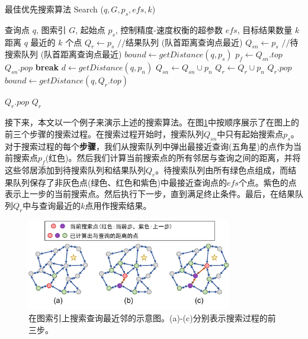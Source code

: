 \begin{algorithm}[t]
  \caption{最佳优先搜索算法 Search ($q, G, p_s, efs, k$)}
  \begin{algorithmic}[1]
    \REQUIRE 
    查询点 $q$, 图索引 $G$, 起始点 $p_s$, 控制精度-速度权衡的超参数 $efs$, 目标结果数量 $k$
    \ENSURE
    距离 $q$ 最近的 $k$ 个点
    \label{alg:search}
    \STATE $Q_r \gets p_s$ $//$结果队列 (队首距离查询点最近)
    \STATE $Q_{sn} \gets p_s$ $//$待搜索队列 (队首距离查询点最近)
    \STATE $bound \gets getDistance(q,p_s)$
      \STATE $p_f \gets Q_{sn}.top$
      \STATE $Q_{sn}.pop$
        \STATE \textbf{break}
      \ENDIF
        \STATE $d \gets getDistance(q,p_n)$
          \STATE $Q_{sn} \gets Q_{sn} \cup p_n$
          \STATE $Q_r \gets Q_r \cup p_n$
            \STATE $Q_r.pop$
          \ENDIF
          \STATE $bound \gets getDistance(q,Q_r.top)$
        \ENDIF
      \ENDFOR
    \ENDWHILE
    
    \STATE $Q_r.pop$
    \ENDWHILE
    \RETURN $Q_r$
  \end{algorithmic} 
\end{algorithm}


接下来，本文以一个例子来演示上述的搜索算法。在图\ref{fig:search-step}中按顺序展示了在图上的前三个步骤的搜索过程。在搜索过程开始时，搜索队列$Q_{sn}$中只有起始搜索点$p_s$。对于搜索过程的每个\textbf{步骤}，我们从搜索队列中弹出最接近查询(五角星)的点作为当前搜索点$p_f$(红色)。然后我们计算当前搜索点的所有邻居与查询之间的距离，并将这些邻居添加到待搜索队列和结果队列$Q_r$。待搜索队列由所有绿色点组成，而结果队列保存了非灰色点(绿色、红色和紫色)中最接近查询点的$efs$个点。紫色的点表示上一步的当前搜索点。然后执行下一步，直到满足终止条件。最后，在结果队列$Q_r$中与查询最近的$k$点用作搜索结果。

\begin{figure}
  \centering
  \includegraphics[width=0.8\textwidth]{figures/Background/search-step.pdf}
  \caption{在图索引上搜索查询最近邻的示意图。(a)-(c)分别表示搜索过程的前三步。}
  \label{fig:search-step}
\end{figure}


